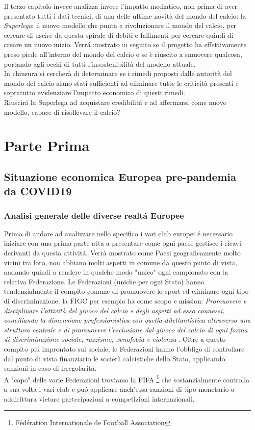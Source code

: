 \documentclass[
    corpo=11.5pt,
    oneside,
    evenboxes,
    tipotesi=triennale,
    stile=classica,
    oldstyle,
    autoretitolo,
    greek,
]{toptesi}
\begin{document}
\begin{interlinea}{1.5}
Il terzo capitolo invece analizza invece l'impatto mediatico, non prima di aver presentato tutti i dati tecnici, di una delle ultime novità 
del mondo del calcio: la \emph{Superlega}: il nuovo modello che punta a rivoluzionare il mondo del calcio, per cercare di uscire da questa spirale di debiti
e fallimenti per cercare quindi di creare un nuovo inizio. Verr\'a mostrato in seguito se il progetto ha effettivamente preso piede all'interno del mondo del calcio 
e se è riuscito a smuovere qualcosa, portando agli occhi di tutti l'insostenibilità del modello attuale.\\
In chiusura si cercherà di determinare se i rimedi proposti dalle autorità del mondo del calcio siano stati sufficienti ad eliminare tutte le criticità presenti e 
sopratutto evidenziare l'impatto economico di questi rimedi.\\
Riuscir\'a la Superlega ad acquistare credibilità e ad affermarsi come nuovo modello, capace di risollevare il calcio?

\part{Parte Prima}
\chapter{Situazione economica Europea pre-pandemia da COVID19}
\section{Analisi generale delle diverse realt\'a Europee}
Prima di andare ad analizzare nello specifico i vari club europei \'e necessario iniziare con una prima 
parte atta a presentare come ogni paese gestisce i ricavi derivanti da questa attivit\'a. Verrà mostrato come Paesi geograficamente
molto vicini tra loro, non abbiano molti aspetti in comune da questo punto di vista, andando quindi a rendere in qualche modo 
"unico" ogni campionato con la relativa Federazione. Le Federazioni (uniche per ogni Stato) hanno tendenzialmente il compito
comune di promuovere lo sport ed eliminare ogni tipo di discriminazione; la FIGC per esempio ha come scopo e mission: 
\emph{Promuovere e disciplinare l’attività del giuoco del calcio e degli aspetti ad esso connessi, conciliando la 
dimensione professionistica con quella dilettantistica attraverso una struttura centrale e di promuovere l’esclusione dal 
giuoco del calcio di ogni forma di discriminazione sociale, razzismo, xenofobia e violenza} \cite{figc}. Oltre a questo compito 
pi\'u improntato sul sociale, le Federazioni hanno l'obbligo di controllare dal punto di vista finanziario le società calcistiche
dello Stato, applicando sanzioni in caso di irregolarit\'a.\\
A "capo" delle varie Federazioni troviamo la FIFA \footnote{Fédération Internationale de Football Association} che sostanzialmente 
controlla a sua volta i vari club e pu\'o applicare anch'essa sanzioni di tipo monetario o addirittura vietare partecipazioni a 
competizioni internazionali.


\end{interlinea}
\end{document}
